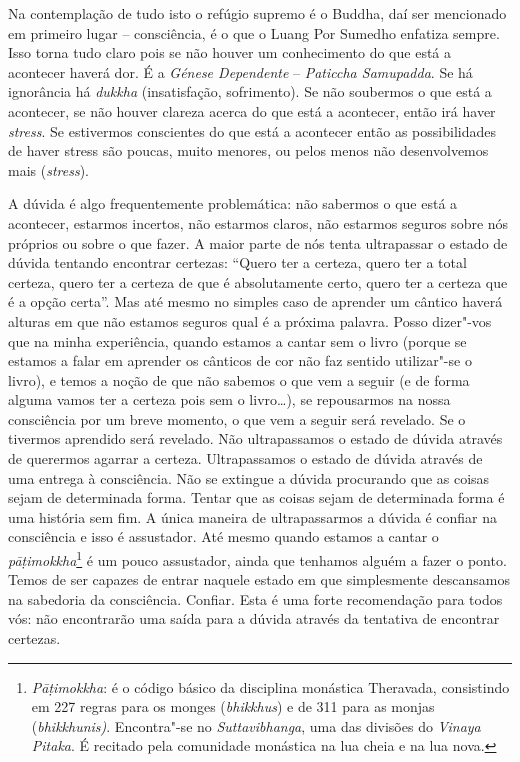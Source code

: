 Na contemplação de tudo isto o refúgio supremo é o Buddha, daí ser
mencionado em primeiro lugar -- consciência, é o que o Luang Por Sumedho
enfatiza sempre. Isso torna tudo claro pois se não houver um
conhecimento do que está a acontecer haverá dor. É a \emph{Génese
Dependente} -- \emph{Paticcha Samupadda}. Se há ignorância há
\emph{dukkha} (insatisfação, sofrimento). Se não soubermos o que está a
acontecer, se não houver clareza acerca do que está a acontecer, então
irá haver \emph{stress}. Se estivermos conscientes do que está a
acontecer então as possibilidades de haver stress são poucas, muito
menores, ou pelos menos não desenvolvemos mais (\emph{stress}).

A dúvida é algo frequentemente problemática: não sabermos o que está a
acontecer, estarmos incertos, não estarmos claros, não estarmos seguros
sobre nós próprios ou sobre o que fazer. A maior parte de nós tenta
ultrapassar o estado de dúvida tentando encontrar certezas: ``Quero ter
a certeza, quero ter a total certeza, quero ter a certeza de que é
absolutamente certo, quero ter a certeza que é a opção certa''. Mas até
mesmo no simples caso de aprender um cântico haverá alturas em que não
estamos seguros qual é a próxima palavra. Posso dizer"-vos que na minha
experiência, quando estamos a cantar sem o livro (porque se estamos a
falar em aprender os cânticos de cor não faz sentido utilizar"-se o
livro), e temos a noção de que não sabemos o que vem a seguir (e de
forma alguma vamos ter a certeza pois sem o livro\ldots{}), se
repousarmos na nossa consciência por um breve momento, o que vem a
seguir será revelado. Se o tivermos aprendido será revelado. Não
ultrapassamos o estado de dúvida através de querermos agarrar a certeza.
Ultrapassamos o estado de dúvida através de uma entrega à consciência.
Não se extingue a dúvida procurando que as coisas sejam de determinada
forma. Tentar que as coisas sejam de determinada forma é uma história
sem fim. A única maneira de ultrapassarmos a dúvida é confiar na
consciência e isso é assustador. Até mesmo quando estamos a cantar o
\emph{pāṭimokkha}\footnote{%
  \emph{Pāṭimokkha}: é o código básico da disciplina monástica
  Theravada, consistindo em 227 regras para os monges (\emph{bhikkhus}) e
  de 311 para as monjas (\emph{bhikkhunis)}. Encontra"-se no
  \emph{Suttavibhanga}, uma das divisões do \emph{Vinaya Pitaka}. É
  recitado pela comunidade monástica na lua cheia e na lua nova.
}
é um pouco assustador, ainda que tenhamos alguém a
fazer o ponto. Temos de ser capazes de entrar naquele estado em que
simplesmente descansamos na sabedoria da consciência. Confiar. Esta é
uma forte recomendação para todos vós: não encontrarão uma saída para a
dúvida através da tentativa de encontrar certezas.

